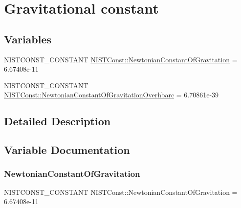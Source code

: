 \hypertarget{group___n_i_s_t_const-_gravitational_constant}{}\section{Gravitational constant}
\label{group___n_i_s_t_const-_gravitational_constant}
\subsection*{Variables}
\begin{DoxyCompactItemize}
\item 
N\+I\+S\+T\+C\+O\+N\+S\+T\+\_\+\+C\+O\+N\+S\+T\+A\+NT \mbox{\hyperlink{group___n_i_s_t_const-_gravitational_constant_gacfed5fae03e441055c1f09406a47f8ce}{N\+I\+S\+T\+Const\+::\+Newtonian\+Constant\+Of\+Gravitation}} = 6.\+67408e-\/11
\item 
N\+I\+S\+T\+C\+O\+N\+S\+T\+\_\+\+C\+O\+N\+S\+T\+A\+NT \mbox{\hyperlink{group___n_i_s_t_const-_gravitational_constant_gaab8e9e8695add729258bef9e2fc7e9bf}{N\+I\+S\+T\+Const\+::\+Newtonian\+Constant\+Of\+Gravitation\+Overhbarc}} = 6.\+70861e-\/39
\end{DoxyCompactItemize}


\subsection{Detailed Description}


\subsection{Variable Documentation}
\mbox{\label{group___n_i_s_t_const-_gravitational_constant_gacfed5fae03e441055c1f09406a47f8ce}} 
\subsubsection{\texorpdfstring{Newtonian\+Constant\+Of\+Gravitation}{NewtonianConstantOfGravitation}}
{\footnotesize\ttfamily N\+I\+S\+T\+C\+O\+N\+S\+T\+\_\+\+C\+O\+N\+S\+T\+A\+NT N\+I\+S\+T\+Const\+::\+Newtonian\+Constant\+Of\+Gravitation = 6.\+67408e-\/11}

